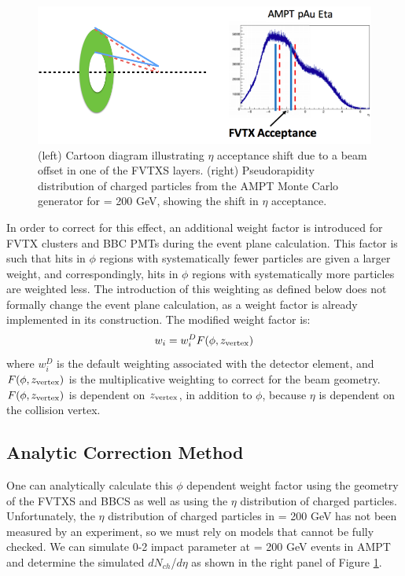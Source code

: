 \begin{figure}[!ht]
\begin{center}
\includegraphics[width=0.95\linewidth]{figs/tilt_effect.png}
\caption{(left) Cartoon diagram illustrating $\eta$ acceptance shift due to a beam offset in one of the FVTXS layers. (right) Pseudorapidity distribution of charged particles from the AMPT Monte Carlo generator for \pau \sqsn = 200 GeV, showing the shift in $\eta$ acceptance.}
\label{fig:tilt_effect}
\end{center}
\end{figure}

In order to correct for this effect, an additional weight factor is introduced for FVTX clusters and BBC PMTs during the event plane calculation. This factor is such that hits in $\phi$ regions with systematically fewer particles are given a larger weight, and correspondingly, hits in $\phi$ regions with systematically more particles are weighted less. The introduction of this weighting as defined below does not formally change the event plane calculation, as a weight factor is already implemented in its construction. The modified weight factor is:
\begin{equation}
w_i = w^D_iF(\phi,z_{\rm vertex})
\label{eqn:modified_weight}
\end{equation}
where $w^D_i$ is the default weighting associated with the detector element, and $F(\phi,z_{\rm vertex})$ is the multiplicative weighting to correct for the beam geometry. $F(\phi,z_{\rm vertex})$ is dependent on $z_{\rm vertex}$, in addition to $\phi$, because $\eta$ is dependent on the collision vertex. 

\subsection{Analytic Correction Method}
One can analytically calculate this $\phi$ dependent weight factor using the geometry of the FVTXS and BBCS as well as using the $\eta$ distribution of charged particles. Unfortunately, the $\eta$ distribution of charged particles in \pau \sqsn = 200 GeV has not been measured by an experiment, so we must rely on models that cannot be fully checked. We can simulate 0-2 impact parameter \pau at \sqsn = 200 GeV events in AMPT and determine the simulated $dN_{ch}$/$d\eta$ as shown in the right panel of Figure \ref{fig:tilt_effect}. 

